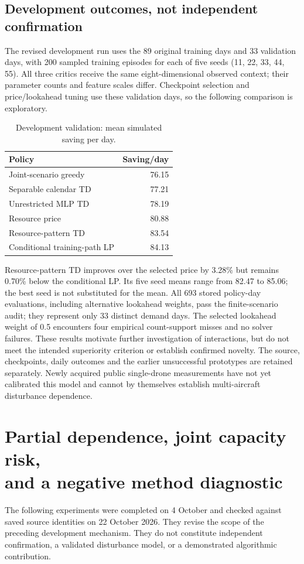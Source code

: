 \documentclass[11pt,a4paper]{article}
\begin{document}
\subsection{Development outcomes, not independent confirmation}
The revised development run uses the 89 original training days and 33 validation days, with 200 sampled training episodes for each of five seeds (11, 22, 33, 44, 55). All three critics receive the same eight-dimensional observed context; their parameter counts and feature scales differ. Checkpoint selection and price/lookahead tuning use these validation days, so the following comparison is exploratory.

\begin{table}[ht]
\centering\caption{Development validation: mean simulated saving per day.}
\begin{tabular}{lr}\toprule
Policy & Saving/day\\\midrule
Joint-scenario greedy &76.15\\
Separable calendar TD &77.21\\
Unrestricted MLP TD &78.19\\
Resource price &80.88\\
Resource-pattern TD &83.54\\
Conditional training-path LP &84.13\\\bottomrule
\end{tabular}
\end{table}

Resource-pattern TD improves over the selected price by 3.28\% but remains 0.70\% below the conditional LP. Its five seed means range from 82.47 to 85.06; the best seed is not substituted for the mean. All 693 stored policy-day evaluations, including alternative lookahead weights, pass the finite-scenario audit; they represent only 33 distinct demand days. The selected lookahead weight of 0.5 encounters four empirical count-support misses and no solver failures. These results motivate further investigation of interactions, but do not meet the intended superiority criterion or establish confirmed novelty. The source, checkpoints, daily outcomes and the earlier unsuccessful prototypes are retained separately. Newly acquired public single-drone measurements have not yet calibrated this model and cannot by themselves establish multi-aircraft disturbance dependence.

\section[Partial dependence, joint capacity risk, and a negative method diagnostic]{Partial dependence, joint capacity risk,\\and a negative method diagnostic}
\label{app:risk}
The following experiments were completed on 4 October and checked against saved source identities on 22 October 2026. They revise the scope of the preceding development mechanism. They do not constitute independent confirmation, a validated disturbance model, or a demonstrated algorithmic contribution.
\end{document}
